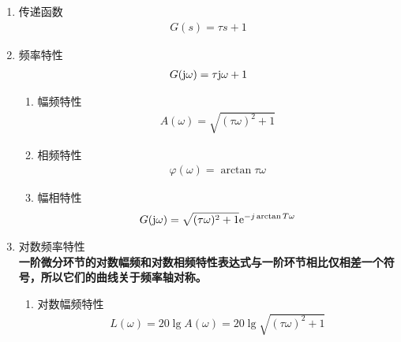 \begin{enumerate}[1.]
	\item 传递函数
	\vspace*{-0.5em}
	\begin{align}
		G(s) = \tau s + 1
	\end{align}
	\vspace*{-3em}
	
	\item 频率特性
	\vspace*{-0.5em}
	\begin{align}
		G(\text{j}  \omega) = \tau \text{j} \omega + 1
	\end{align}
	\vspace*{-3em}
	\begin{enumerate}[(1) ]
		\item 幅频特性
		\vspace*{-0.5em}
		\begin{align}
			A(\omega) = \sqrt{(\tau \omega)^2 + 1}
		\end{align}
		\vspace*{-3em}
		
		\item 相频特性
		\begin{align}
			\varphi(\omega) = \arctan \tau \omega
		\end{align}
		\vspace*{-3em}
		
		\item 幅相特性
		\vspace*{-0.5em}
		\begin{align}
			G(\text{j} \omega) = \sqrt{(\tau \omega)^2 + 1}{\rm{e}}^{-j  \arctan T\omega}
		\end{align}
		\vspace*{-3em}
		
	\end{enumerate}
	\item 对数频率特性\\
	\textbf{一阶微分环节的对数幅频和对数相频特性表达式与一阶环节相比仅相差一个符号，所以它们的曲线关于频率轴对称。}
	\begin{enumerate}[(1) ]
		\item 对数幅频特性
		\vspace*{-0.5em}
		\begin{align}
			L(\omega) = 20 \lg A(\omega) = 20 \lg \sqrt{(\tau \omega)^2 + 1}
		\end{align}
		

\end{enumerate}
\end{enumerate}
